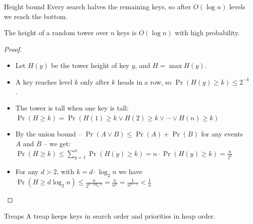 \documentclass[aspectratio=169]{beamer}
\begin{document}
\begin{frame}{Height bound}
  Every search halves the remaining keys, so after $O(\log n)$ levels we reach the bottom.
\end{frame}
\begin{frame}
  \begin{theorem}
    The height of a random tower over $n$ keys is $O(\log n)$ with high probability.
  \end{theorem}
  \begin{proof}
    \begin{itemize}
      \item Let $H(y)$ be the tower height of key $y$, and $H = \max H(y)$.
      \item A key reaches level $k$ only after $k$ heads in a row,
            so $\Pr(H(y) \geq k) \leq 2^{-k}$.
      \item The tower is tall when one key is tall:
            $\Pr(H \geq k) = \Pr(H(1) \geq k \vee H(2) \geq k \vee \cdots \vee H(n) \geq k)$
      \item By the union bound -- $\Pr(A \vee B) \leq \Pr(A) + \Pr(B)$ for any events $A$ and $B$ --
            we get: $\Pr(H \geq k) \leq \sum_{y=1}^{n} \Pr(H(y) \geq k) = n \cdot \Pr(H(y) \geq k) = \frac{n}{2^k}$
      \item For any $d > 2$, with $k = d \cdot \log_2 n$ we have $\Pr(H \geq d \log_2 n) \leq \frac{n}{2^{d \cdot \log_2 n}} = \frac{n}{n^d} = \frac{1}{n^{d-1}} < \frac{1}{n}$
    \end{itemize}
  \end{proof}
\end{frame}
\begin{frame}{Treaps}
  A treap keeps keys in search order and priorities in heap order.
\end{frame}
\end{document}
